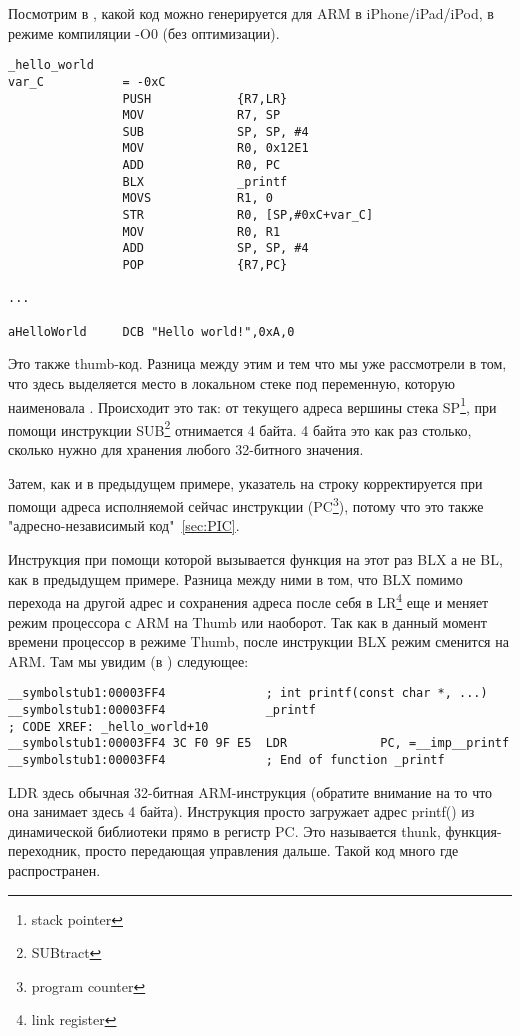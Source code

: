 Посмотрим в \IDA, какой код можно генерируется для ARM в iPhone/iPad/iPod, в режиме компиляции -O0 
(без оптимизации).

\begin{lstlisting}
_hello_world
var_C           = -0xC
                PUSH            {R7,LR}
                MOV             R7, SP
                SUB             SP, SP, #4
                MOV             R0, 0x12E1
                ADD             R0, PC
                BLX             _printf
                MOVS            R1, 0
                STR             R0, [SP,#0xC+var_C]
                MOV             R0, R1
                ADD             SP, SP, #4
                POP             {R7,PC}

...

aHelloWorld     DCB "Hello world!",0xA,0
\end{lstlisting}

Это также thumb-код.
Разница между этим и тем что мы уже рассмотрели в том, что здесь выделяется место в локальном стеке под переменную,
которую \IDA наименовала . Происходит это так: от текущего адреса вершины стека SP\footnote{stack pointer}, при помощи инструкции SUB\footnote{SUBtract} отнимается 4 байта. 4 байта это как раз столько, сколько нужно для хранения любого 32-битного значения. 

Затем, как и в предыдущем примере, указатель на строку 
корректируется при помощи адреса исполняемой сейчас инструкции (PC\footnote{program counter}), потому что это также "адресно-независимый код"~\ref{sec:PIC}. 

Инструкция при помощи которой вызывается функция  на этот раз BLX а не BL, как в предыдущем примере.
Разница между ними в том, что BLX помимо перехода на другой адрес и сохранения адреса после себя в LR\footnote{link register} еще и меняет режим процессора с ARM на Thumb или наоборот. Так как в данный момент времени процессор в режиме Thumb, после инструкции BLX режим сменится на ARM. Там мы увидим (в \IDA) следующее:

\begin{lstlisting}
__symbolstub1:00003FF4              ; int printf(const char *, ...)
__symbolstub1:00003FF4              _printf                                 ; CODE XREF: _hello_world+10
__symbolstub1:00003FF4 3C F0 9F E5  LDR             PC, =__imp__printf
__symbolstub1:00003FF4              ; End of function _printf
\end{lstlisting}

LDR здесь обычная 32-битная ARM-инструкция (обратите внимание на то что она занимает здесь 4 байта). Инструкция
просто загружает адрес printf() из динамической библиотеки прямо в регистр PC. Это называется thunk, функция-переходник, просто передающая управления дальше. Такой код много где распространен.

